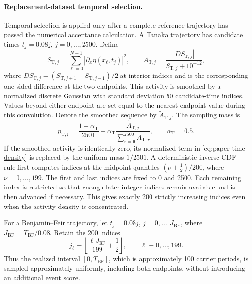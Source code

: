 \paragraph{Replacement-dataset temporal selection.}
Temporal selection is applied only after a complete reference trajectory has
passed the numerical acceptance calculation.  A Tanaka trajectory has
candidate times $t_j=0.08j$, $j=0,\ldots,2500$.  Define
\begin{equation}
  S_{\mathrm T,j}
  =
  \sum_{\ell=0}^{N-1}
  |\partial_x\eta(x_\ell,t_j)|^2,
  \qquad
  A_{\mathrm T,j}
  =
  \frac{|D S_{\mathrm T,j}|}{S_{\mathrm T,j}+10^{-12}},
  \label{eq:paper-tanaka-activity}
\end{equation}
where $D S_{\mathrm T,j}=(S_{\mathrm T,j+1}-S_{\mathrm T,j-1})/2$ at
interior indices and is the corresponding one-sided difference at the two
endpoints.  This activity is smoothed by a normalized discrete Gaussian with
standard deviation 50 candidate-time indices.  Values beyond either endpoint
are set equal to the nearest endpoint value during this convolution.  Denote
the smoothed sequence by $\widetilde A_{\mathrm T,j}$.  The sampling mass is
\begin{equation}
  p_{\mathrm T,j}
  =
  \frac{1-\alpha_{\mathrm T}}{2501}
  +
  \alpha_{\mathrm T}
  \frac{\widetilde A_{\mathrm T,j}}
       {\sum_{r=0}^{2500}\widetilde A_{\mathrm T,r}},
  \qquad \alpha_{\mathrm T}=0.5.
  \label{eq:paper-time-density}
\end{equation}
If the smoothed activity is identically zero, its normalized term in
\cref{eq:paper-time-density} is replaced by the uniform mass $1/2501$.
A deterministic inverse-CDF rule first computes indices at the
midpoint quantiles $(\nu+\tfrac12)/200$, where
$\nu=0,\ldots,199$.  The first and last indices are fixed to 0 and 2500.
Each remaining index is restricted so that enough later integer indices
remain available and is then advanced if necessary.  This gives exactly 200
strictly increasing indices even when the activity density is concentrated.

For a Benjamin--Feir trajectory, let
$t_j=0.08j$, $j=0,\ldots,J_{\mathrm{BF}}$, where
$J_{\mathrm{BF}}=T_{\mathrm{BF}}/0.08$.  Retain the 200 indices
\begin{equation}
  j_\ell
  =\left\lfloor\frac{\ell J_{\mathrm{BF}}}{199}+\frac12\right\rfloor,
  \qquad \ell=0,\ldots,199.
  \label{eq:paper-bf-retained-indices}
\end{equation}
Thus the realized interval $[0,T_{\mathrm{BF}}]$, which is approximately
100 carrier periods, is sampled approximately uniformly, including both
endpoints, without introducing an additional event score.

